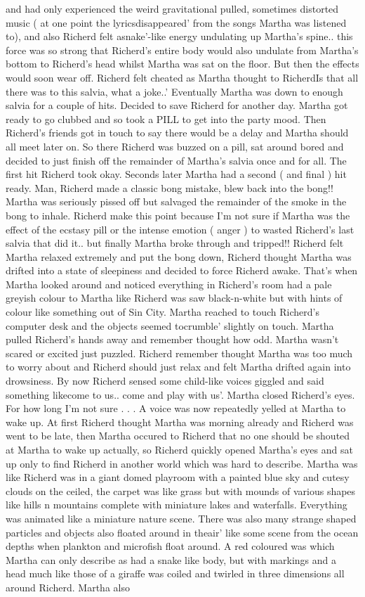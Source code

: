 \documentclass[12pt]{book}
\begin{document}
and had only experienced the weird gravitational pulled, sometimes distorted music ( at one point the lyricsdisappeared' from the songs Martha was listened to), and also Richerd felt asnake'-like energy undulating up Martha's spine.. this force was so strong that Richerd's entire body would also undulate from Martha's bottom to Richerd's head whilst Martha was sat on the floor. But then the effects would soon wear off. Richerd felt cheated as Martha thought to RicherdIs that all there was to this salvia, what a joke..' Eventually Martha was down to enough salvia for a couple of hits. Decided to save Richerd for another day. Martha got ready to go clubbed and so took a PILL to get into the party mood. Then Richerd's friends got in touch to say there would be a delay and Martha should all meet later on. So there Richerd was buzzed on a pill, sat around bored and decided to just finish off the remainder of Martha's salvia once and for all. The first hit Richerd took okay. Seconds later Martha had a second ( and final ) hit ready. Man, Richerd made a classic bong mistake, blew back into the bong!! Martha was seriously pissed off but salvaged the remainder of the smoke in the bong to inhale. Richerd make this point because I'm not sure if Martha was the effect of the ecstasy pill or the intense emotion ( anger ) to wasted Richerd's last salvia that did it.. but finally Martha broke through and tripped!! Richerd felt Martha relaxed extremely and put the bong down, Richerd thought Martha was drifted into a state of sleepiness and decided to force Richerd awake. That's when Martha looked around and noticed everything in Richerd's room had a pale greyish colour to Martha like Richerd was saw black-n-white but with hints of colour like something out of Sin City. Martha reached to touch Richerd's computer desk and the objects seemed tocrumble' slightly on touch. Martha pulled Richerd's hands away and remember thought how odd. Martha wasn't scared or excited just puzzled. Richerd remember thought Martha was too much to worry about and Richerd should just relax and felt Martha drifted again into drowsiness. By now Richerd sensed some child-like voices giggled and said something likecome to us.. come and play with us'. Martha closed Richerd's eyes. For how long I'm not sure . . .  A voice was now repeatedly yelled at Martha to wake up. At first Richerd thought Martha was morning already and Richerd was went to be late, then Martha occured to Richerd that no one should be shouted at Martha to wake up actually, so Richerd quickly opened Martha's eyes and sat up only to find Richerd in another world which was hard to describe. Martha was like Richerd was in a giant domed playroom with a painted blue sky and cutesy clouds on the ceiled, the carpet was like grass but with mounds of various shapes like hills n mountains complete with miniature lakes and waterfalls. Everything was animated like a miniature nature scene. There was also many strange shaped particles and objects also floated around in theair' like some scene from the ocean depths when plankton and microfish float around. A red coloured was which Martha can only describe as had a snake like body, but with markings and a head much like those of a giraffe was coiled and twirled in three dimensions all around Richerd. Martha also 
\end{document}
